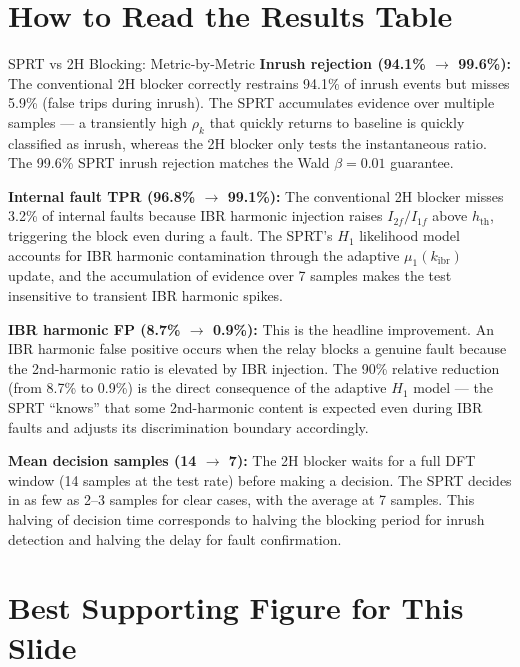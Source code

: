 \documentclass[12pt,a4paper]{article}
\newcommand{\kibr}{k_\mathrm{ibr}}
\begin{document}
\section{How to Read the Results Table}

\begin{resultbox}{SPRT vs 2H Blocking: Metric-by-Metric}
\textbf{Inrush rejection (94.1\% $\to$ 99.6\%):}
The conventional 2H blocker correctly restrains 94.1\% of inrush events but misses 5.9\% (false trips during inrush). The SPRT accumulates evidence over multiple samples --- a transiently high $\rho_k$ that quickly returns to baseline is quickly classified as inrush, whereas the 2H blocker only tests the instantaneous ratio. The 99.6\% SPRT inrush rejection matches the Wald $\beta = 0.01$ guarantee.

\medskip
\textbf{Internal fault TPR (96.8\% $\to$ 99.1\%):}
The conventional 2H blocker misses 3.2\% of internal faults because IBR harmonic injection raises $I_{2f}/I_{1f}$ above $h_\mathrm{th}$, triggering the block even during a fault. The SPRT's $H_1$ likelihood model accounts for IBR harmonic contamination through the adaptive $\mu_1(\kibr)$ update, and the accumulation of evidence over 7 samples makes the test insensitive to transient IBR harmonic spikes.

\medskip
\textbf{IBR harmonic FP (8.7\% $\to$ 0.9\%):}
This is the headline improvement. An IBR harmonic false positive occurs when the relay blocks a genuine fault because the 2nd-harmonic ratio is elevated by IBR injection. The 90\% relative reduction (from 8.7\% to 0.9\%) is the direct consequence of the adaptive $H_1$ model --- the SPRT ``knows'' that some 2nd-harmonic content is expected even during IBR faults and adjusts its discrimination boundary accordingly.

\medskip
\textbf{Mean decision samples (14 $\to$ 7):}
The 2H blocker waits for a full DFT window (14 samples at the test rate) before making a decision. The SPRT decides in as few as 2--3 samples for clear cases, with the average at 7 samples. This halving of decision time corresponds to halving the blocking period for inrush detection and halving the delay for fault confirmation.
\end{resultbox}

\section{Best Supporting Figure for This Slide}
\end{document}
